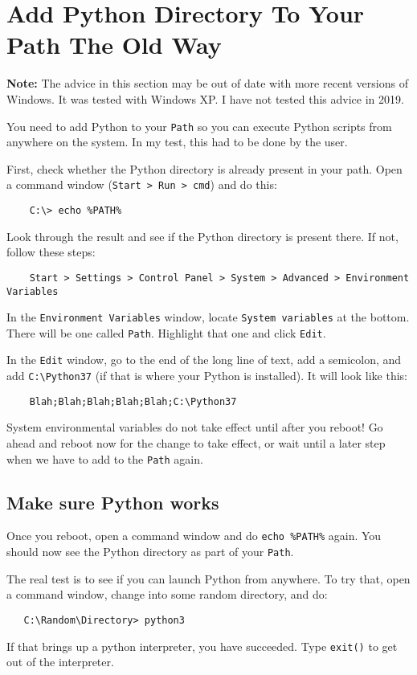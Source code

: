 \section{Add Python Directory To Your Path The Old Way}

\textbf{Note:} The advice in this section may be out of date with more
recent versions of Windows. It was tested with Windows XP. I have not tested this advice in 2019.

You need to add Python to your \texttt{Path} so you can execute Python scripts
from anywhere on the system. In my test, this had to be done by the user.

First, check whether the Python directory is already present in your
path. Open a command window (\texttt{Start > Run > cmd}) and do this:

\begin{verbatim}
    C:\> echo %PATH%
\end{verbatim}

Look through the result and see if the Python directory is present
there. If not, follow these steps:

\begin{verbatim}
    Start > Settings > Control Panel > System > Advanced > Environment Variables
\end{verbatim}

In the \texttt{Environment Variables} window, locate \texttt{System variables} at the
bottom. There will be one called \texttt{Path}. Highlight that one and
click \texttt{Edit}.

In the \texttt{Edit} window, go to the end of the long line of text, add a
semicolon, and add \texttt{C:\textbackslash{}Python37} (if that is where your Python is
installed). It will look like this:

\begin{verbatim}
    Blah;Blah;Blah;Blah;Blah;C:\Python37
\end{verbatim}

System environmental variables do not take effect until after you
reboot! Go ahead and reboot now for the change to take effect, or
wait until a later step when we have to add to the \texttt{Path} again.

\subsection{Make sure Python works}

Once you reboot, open a command window and do \texttt{echo \%PATH\%} again.
You should now see the Python directory as part of your \texttt{Path}.

The real test is to see if you can launch Python from anywhere. To try
that, open a command window, change into some random directory, and
do:

\begin{verbatim}
   C:\Random\Directory> python3
\end{verbatim}

If that brings up a python interpreter, you have succeeded.
Type \texttt{exit()} to get out of the interpreter.
